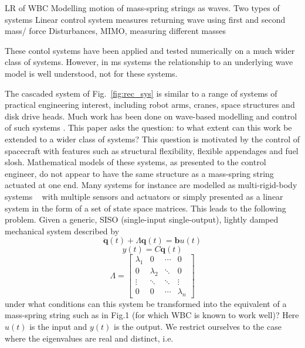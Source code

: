 \documentclass{mbd_fullpaper}
\begin{document}
LR of WBC
Modelling motion of mass-spring strings as waves.
Two types of systems
Linear control system measures returning wave using first and second mass/ force
Disturbances, MIMO, measuring different masses

These contol systems have been applied and tested numerically on a much wider class of systems.
However, in ms systems the relationship to an underlying wave model is well understood, not for these systems.

The cascaded system of Fig.~\ref{fig:rec_sys} is similar to a range of systems of practical engineering interest, including robot arms, cranes, space structures and disk drive heads. Much work has been done on wave-based modelling and control of such systems \cite{OConnor2011, Connor2005}. This paper asks the question: to what extent can this work be extended to a wider class of systems? 
This question is motivated by the control of spacecraft with features such as structural flexibility, flexible appendages and fuel slosh.
Mathematical models of these systems, as presented to the control engineer, do not appear to have the same structure as a mass-spring string actuated at one end.
Many systems for instance are modelled as multi-rigid-body systems ~\cite{Kane1980} with multiple sensors and actuators or simply presented as a linear system in the form of a set of state space matrices.
This leads to the following problem. Given a generic, SISO (single-input single-output), lightly damped mechanical system described by
\begin{equation}
\ddot{\mathbf{q}}(t) + \Lambda\mathbf{q}(t) = \mathbf{b}u(t)
\label{eq:modal1}
\end{equation}
\begin{equation}
y(t) = C \mathbf{q}(t)
\label{eq:modal2}
\end{equation}
\begin{equation}
\Lambda = \begin{bmatrix}
\lambda_1  &  0 & \cdots & 0 \\
0 & \lambda_2  & \ddots & 0 \\
\vdots & \ddots & \ddots & \vdots \\
0 & 0 & \cdots & \lambda_n \end{bmatrix}
\end{equation}
under what conditions can this system be transformed into the equivalent of a mass-spring string such as in Fig.1 (for which WBC is known to work well)?
Here $u(t)$ is the input and $y(t)$ is the output.
We restrict ourselves to the case where the eigenvalues are real and distinct, i.e.
\end{document}
